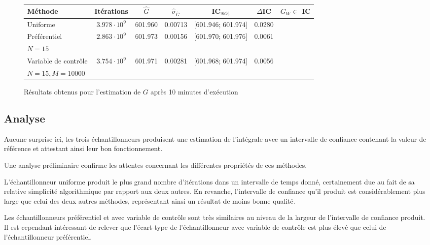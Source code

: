 \documentclass[a4paper,11pt]{article}
\newcommand{\cmark}{\ding{51}}%
\begin{document}
\begin{figure}[h]
\bgroup
\def\arraystretch{1.2}
\begin{center}
\begin{tabular}{|lcccccc|}
	\hline
	\textbf{Méthode} & \textbf{Itérations} & $\hat{G}$ & $\hat{\sigma}_{\hat{G}}$ & \textbf{IC$_{95\%}$} & \textbf{$\Delta$IC} & \textbf{$G_W \in$ IC}\\
	\hline
	Uniforme & $3.978 \cdot 10^9$ & 601.960 & 0.00713 & [601.946; 601.974] & 0.0280 & \cmark\\
	\hline
	Préférentiel & $2.863 \cdot 10^9$ & 601.973 & 0.00156 & [601.970; 601.976] & 0.0061 & \cmark\\
	$N=15$ & & & & & &\\
	\hline
	Variable de contrôle & $3.754 \cdot 10^9$ & 601.971 & 0.00281 & [601.968; 601.974] & 0.0056 & \cmark\\
	$N=15,M=10000$ & & & & & &\\
	\hline
\end{tabular}
\end{center}
\egroup
\caption{Résultats obtenus pour l'estimation de $G$ après 10 minutes d'exécution}
\end{figure}

\subsection{Analyse}

Aucune surprise ici, les trois échantillonneurs produisent une estimation de l'intégrale avec un intervalle de confiance contenant la valeur de référence et attestant ainsi leur bon fonctionnement.

Une analyse préliminaire confirme les attentes concernant les différentes propriétés de ces méthodes.

L'échantillonneur uniforme produit le plus grand nombre d'itérations dans un intervalle de temps donné, certainement due au fait de sa relative simplicité algorithmique par rapport aux deux autres. En revanche, l'intervalle de confiance qu'il produit est considérablement plus large que celui des deux autres méthodes, représentant ainsi un résultat de moins bonne qualité.

Les échantillonneurs préférentiel et avec variable de contrôle sont très similaires au niveau de la largeur de l'intervalle de confiance produit. Il est cependant intéressant de relever que l'écart-type de l'échantillonneur avec variable de contrôle est plus élevé que celui de l'échantillonneur préférentiel.
\end{document}
